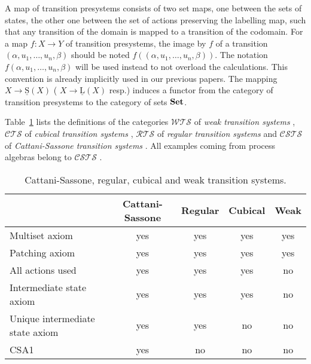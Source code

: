 \documentclass[a4paper,12pt]{amsart}
\begin{document}
A map of transition presystems consists of two set maps, one between
the sets of states, the other one between the set of actions
preserving the labelling map, such that any transition of the domain
is mapped to a transition of the codomain. For a map $f:X\to Y$ of
transition presystems, the image by $f$ of a transition
$(\alpha,u_1,\dots,u_n,\beta)$ should be noted
$f((\alpha,u_1,\dots,u_n,\beta))$. The notation
$f(\alpha,u_1,\dots,u_n,\beta)$ will be used instead to not overload
the calculations. This convention is already implicitly used in our
previous papers. The mapping $X\to \operatorname{\underline{S}}(X)$ ( $X\to \operatorname{\underline{L}}(X)$ resp.)
induces a functor from the category of transition presystems to the
category of sets ${{{\rm{\mathbf{{Set}}}}}}$.

Table~\ref{alldefs} lists the definitions of the categories ${\mathcal{W\!T\!S}}$ of
\emph{weak transition systems} \cite[Definition~3.2]{hdts}, ${\mathcal{C\!T\!S}}$ of
\emph{cubical transition systems} \cite[Proposition~6.7]{cubicalhdts},
${\mathcal{R\!T\!S}}$ of \emph{regular transition systems}
\cite[Definition~2.2]{csts} and ${\mathcal{C\!S\!T\!S}}$ of \emph{Cattani-Sassone
  transition systems} \cite[Table~1]{csts}. All examples coming from
process algebras belong to ${\mathcal{C\!S\!T\!S}}$ \cite{ccsprecub} \cite{symcub}
\cite{hdts}.

\begin{table}[ht]
\begin{tabular}{|l|c|c|c|c|}
\hline
& Cattani-Sassone & Regular & Cubical & Weak  \\
\hline
Multiset axiom & yes & yes & yes & yes \\
\hline
Patching axiom & yes & yes & yes & yes \\
\hline
All actions used &  yes & yes & yes & no \\
\hline
Intermediate state axiom & yes & yes & yes & no\\
\hline
Unique intermediate state axiom  & yes & yes & no & no \\
\hline
CSA1 & yes & no & no & no \\
\hline
\end{tabular}
\caption{Cattani-Sassone, regular, cubical and weak transition systems.}
\label{alldefs}
\end{table}
\end{document}
